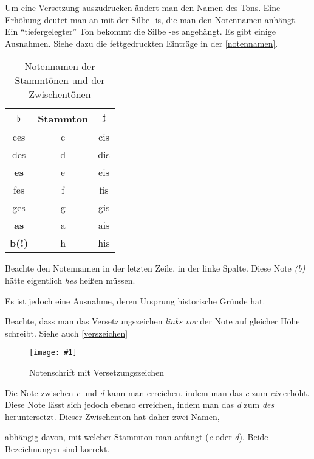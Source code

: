 \documentclass[10pt,a4paper,twoside]{report}
\newcommand{\comment}[1]{
	\marginpar{
		\textsf{#1}
	}
}
\newcommand{\image}[4]{
	\begin{figure}[!ht]
		\centering
		\texttt{[image: \#1]}
		\caption{#2}
		\label{#3}
	\end{figure}
}
\begin{document}
Um eine Versetzung auszudrucken ändert man den Namen des Tons. 
Eine Erhöhung deutet man an mit der
Silbe -is, die man den Notennamen anhängt. 
Ein "`tiefergelegter"' Ton bekommt die Silbe 
-es angehängt. Es gibt einige Ausnahmen. Siehe dazu die 
fettgedruckten Einträge in der \autoref{notennamen}.
\begin{table}[ht]
    \centering
    \begin{tabular}{|c|c|c|}
    \hline 
    $\flat$ & Stammton & $\sharp$ \\ 
    \hline \hline
    ces & c & cis \\ 
    \hline 
    des & d & dis \\ 
    \hline 
    \textbf{es} & e & eis \\ 
    \hline 
    fes & f & fis \\ 
    \hline 
    ges & g & gis \\ 
    \hline 
    \textbf{as} & a & ais \\ 
    \hline 
    \textbf{b(!)} & h & his \\ 
    \hline 
    \end{tabular} 
    \caption{Notennamen der Stammtönen und der Zwischentönen}
    \label{notennamen}
\end{table}

Beachte den Notennamen in der letzten Zeile, in der linke Spalte. 
Diese Note \emph{(b)} hätte eigentlich \emph{hes} heißen müssen.
\comment{hes $\rightarrow$ b}
Es ist jedoch eine Ausnahme, deren Ursprung
historische Gründe hat.

Beachte, dass man das Versetzungszeichen \emph{links vor} der Note 
auf gleicher Höhe schreibt. 
Siehe auch \autoref{verszeichen} 
\image{lilypond/versetzung.png}{Notenschrift mit
     Versetzungszeichen}{verszeichen}{5}

Die Note zwischen \emph{c} und \emph{d} kann man erreichen, indem man das 
\emph{c} zum \emph{cis} erhöht.
Diese Note lässt sich jedoch ebenso erreichen, indem man das 
\emph{d} zum \emph{des} heruntersetzt. Dieser Zwischenton
hat daher zwei Namen, 
\comment{cis = des}
abhängig davon, mit welcher Stammton man anfängt
(\emph{c} oder \emph{d}). Beide Bezeichnungen sind korrekt.
\end{document}
